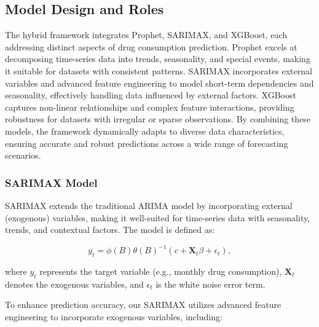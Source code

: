 \documentclass[journal]{IEEEtran}
\begin{document}
\subsection{Model Design and Roles}

The hybrid framework integrates Prophet, SARIMAX, and XGBoost, each addressing distinct aspects of drug consumption prediction. Prophet excels at decomposing time-series data into trends, seasonality, and special events, making it suitable for datasets with consistent patterns. SARIMAX incorporates external variables and advanced feature engineering to model short-term dependencies and seasonality, effectively handling data influenced by external factors. XGBoost captures non-linear relationships and complex feature interactions, providing robustness for datasets with irregular or sparse observations. By combining these models, the framework dynamically adapts to diverse data characteristics, ensuring accurate and robust predictions across a wide range of forecasting scenarios.

\subsubsection{SARIMAX Model}

SARIMAX extends the traditional ARIMA model by incorporating external (exogenous) variables, making it well-suited for time-series data with seasonality, trends, and contextual factors. The model is defined as:

\begin{equation}
y_{t} = \phi(B)\theta(B)^{-1} \left( c + \mathbf{X}_{t}\beta + \epsilon_{t} \right),
\end{equation}

where \(y_{t}\) represents the target variable (e.g., monthly drug consumption), \(\mathbf{X}_{t}\) denotes the exogenous variables, and \(\epsilon_{t}\) is the white noise error term. 

To enhance prediction accuracy, our SARIMAX utilizes advanced feature engineering to incorporate exogenous variables, including:
\end{document}
